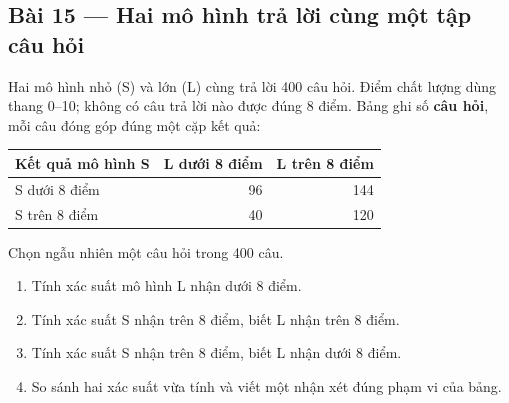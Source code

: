 \documentclass[11pt,a4paper]{article}
\begin{document}
\par\medskip

\noindent\begin{minipage}{\linewidth}
\subsection*{Bài 15 --- Hai mô hình trả lời cùng một tập câu hỏi}

Hai mô hình nhỏ (S) và lớn (L) cùng trả lời 400 câu hỏi. Điểm chất lượng dùng thang 0--10; không có câu trả lời nào được đúng 8 điểm. Bảng ghi số \textbf{câu hỏi}, mỗi câu đóng góp đúng một cặp kết quả:
\begin{center}\renewcommand{\arraystretch}{1.2}
\begin{tabular}{lrr}\toprule
Kết quả mô hình S & L dưới 8 điểm & L trên 8 điểm\\\midrule
S dưới 8 điểm&96&144\\
S trên 8 điểm&40&120\\\bottomrule
\end{tabular}\end{center}
Chọn ngẫu nhiên một câu hỏi trong 400 câu.

\begin{enumerate}[label=\alph*)]
\item Tính xác suất mô hình L nhận dưới 8 điểm.
\item Tính xác suất S nhận trên 8 điểm, biết L nhận trên 8 điểm.
\item Tính xác suất S nhận trên 8 điểm, biết L nhận dưới 8 điểm.
\item So sánh hai xác suất vừa tính và viết một nhận xét đúng phạm vi của bảng.
\end{enumerate}

\end{minipage}\par

\par\medskip
\end{document}
